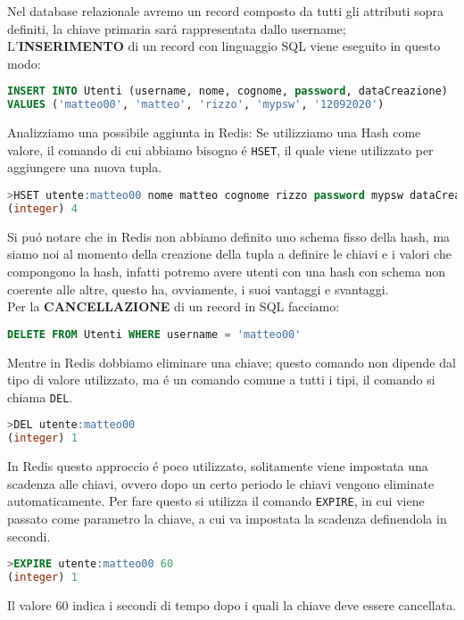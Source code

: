 Nel database relazionale avremo un record composto da tutti gli attributi sopra definiti, la chiave primaria sará rappresentata dallo username;\\

L'\textbf{INSERIMENTO} di un record con linguaggio SQL viene eseguito in questo modo:
\begin{lstlisting}[autogobble, style=redis-cli, language=SQL]
INSERT INTO Utenti (username, nome, cognome, password, dataCreazione)
VALUES ('matteo00', 'matteo', 'rizzo', 'mypsw', '12092020')\end{lstlisting}

Analizziamo una possibile aggiunta in Redis:
Se utilizziamo una Hash come valore, il comando di cui abbiamo bisogno é \texttt{HSET}, il quale viene utilizzato per aggiungere una nuova tupla.
\begin{lstlisting}[autogobble, style=redis-cli, language=SQL]
>HSET utente:matteo00 nome matteo cognome rizzo password mypsw dataCreazione 12092020
(integer) 4\end{lstlisting}

Si puó notare che in Redis non abbiamo definito uno schema fisso della hash, ma siamo noi al momento della creazione della tupla a definire le chiavi e i valori che compongono la hash,
infatti potremo avere utenti con una hash con schema non coerente alle altre, questo ha, ovviamente, i suoi vantaggi e svantaggi.\\

Per la \textbf{CANCELLAZIONE} di un record in SQL facciamo:
\begin{lstlisting}[autogobble, style=redis-cli, language=SQL]
DELETE FROM Utenti WHERE username = 'matteo00'\end{lstlisting}

Mentre in Redis dobbiamo eliminare una chiave; questo comando non dipende dal tipo di valore utilizzato, ma é un comando comune
a tutti i tipi, il comando si chiama \texttt{DEL}.

\begin{lstlisting}[autogobble, style=redis-cli, language=SQL]
>DEL utente:matteo00
(integer) 1\end{lstlisting}

In Redis questo approccio é poco utilizzato, solitamente viene impostata una scadenza alle chiavi, ovvero dopo un certo periodo le chiavi vengono eliminate automaticamente.
Per fare questo si utilizza il comando \texttt{EXPIRE}, in cui viene passato come parametro la chiave, a cui va impostata la scadenza definendola in secondi.
\begin{lstlisting}[autogobble, style=redis-cli, language=SQL]
>EXPIRE utente:matteo00 60
(integer) 1\end{lstlisting}
Il valore 60 indica i secondi di tempo dopo i quali la chiave deve essere cancellata.\\
 \\



